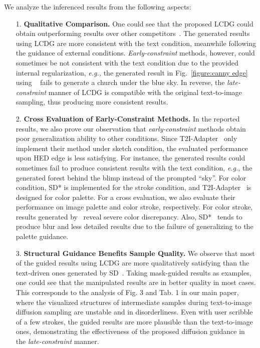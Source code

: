 \documentclass{article}
\begin{document}
We analyze the inferenced results from the following aspects:
\begin{itemize}
  \item[1.] \textbf{Qualitative Comparison.} One could see that the proposed LCDG could obtain outperforming results over other competitors~\cite{rombach2022high,zhang2023adding,mou2023t2i,meng2021sdedit}. The generated results using LCDG are more consistent with the text condition, meanwhile following the guidance of external conditions. \textit{Early-constraint} methods, however, could sometimes be not consistent with the text condition due to the provided internal regularization, \textit{e.g.,} the generated result in Fig.~\ref{figure:canny edge} using ~\cite{mou2023t2i} fails to generate a church under the blue sky. In reverse, the \textit{late-constraint} manner of LCDG is compatible with the original text-to-image sampling, thus producing more consistent results.
  \item[2.] \textbf{Cross Evaluation of Early-Constraint Methods.} In the reported results, we also prove our observation that \textit{early-constraint} methods obtain poor generalization ability to other conditions. Since T2I-Adapter~\cite{mou2023t2i} only implement their method under sketch condition, the evaluated performance upon HED edge is less satisfying. For instance, the generated results could sometimes fail to produce consistent results with the text condition, \textit{e.g.}, the generated forest behind the blimp instead of the prompted ``sky''. For color condition, SD* is implemented for the stroke condition, and T2I-Adapter~\cite{mou2023t2i} is designed for color palette. For a cross evaluation, we also evaluate their performance on image palette and color stroke, respectively. For color stroke, results generated by~\cite{mou2023t2i} reveal severe color discrepancy. Also, SD*~\cite{rombach2022high} tends to produce blur and less detailed results due to the failure of generalizing to the palette guidance.
  \item[3.] \textbf{Structural Guidance Benefits Sample Quality.} We observe that most of the guided results using LCDG are more qualitatively satisfying than the text-driven ones generated by SD~\cite{rombach2022high}. Taking mask-guided results as examples, one could see that the manipulated results are in better quality in most cases. This corresponds to the analysis of Fig. 3 and Tab. 1 in our main paper, where the visualized structures of intermediate samples during text-to-image diffusion sampling are unstable and in disorderliness. Even with user scribble of a few strokes, the guided results are more plausible than the text-to-image ones, demonstrating the effectiveness of the proposed diffusion guidance in the \textit{late-constraint} manner.
\end{itemize}
\end{document}
